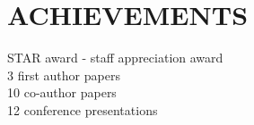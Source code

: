 \documentclass[letterpaper]{deedy-resume} %
\begin{document}
\begin{minipage}[t]{0.33\textwidth}
\sectionspace %

\section{ACHIEVEMENTS}
STAR award - staff appreciation award \\
3 first author papers\\
10 co-author papers\\
12 conference presentations\\


\end{minipage} %
\hfill
%
%
\end{document}
